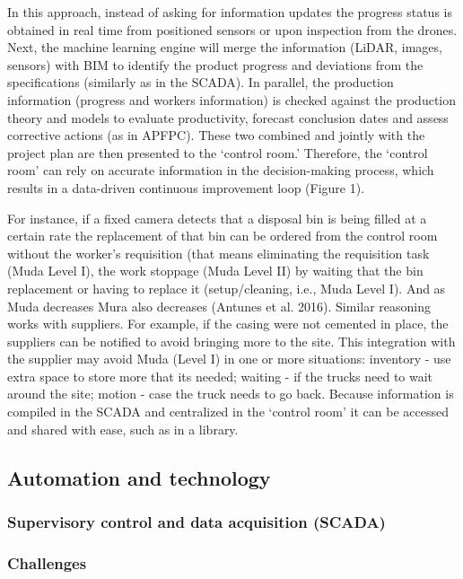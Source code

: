 \documentclass{article}
\begin{document}
In this approach, instead of asking for information updates the progress status is obtained in real time from positioned sensors or upon inspection from the drones.
Next, the machine learning engine will merge the information (LiDAR, images, sensors) with BIM to identify the product progress and deviations from the specifications (similarly as in the SCADA).
In parallel, the production information (progress and workers information) is checked against the production theory and models to evaluate productivity, forecast conclusion dates and assess corrective actions (as in APFPC).
These two combined and jointly with the project plan are then presented to the ‘control room.’
Therefore, the ‘control room’ can rely on accurate information in the decision-making process, which results in a data-driven continuous improvement loop (Figure 1).

For instance, if a fixed camera detects that a disposal bin is being filled at a certain rate the replacement of that bin can be ordered from the control room without the worker’s requisition (that means eliminating the requisition task (Muda Level I), the work stoppage (Muda Level II) by waiting that the bin replacement or having to replace it (setup/cleaning, i.e., Muda Level I).
And as Muda decreases Mura also decreases (Antunes et al. 2016).
Similar reasoning works with suppliers.
For example, if the casing were not cemented in place, the suppliers can be notified to avoid bringing more to the site.
This integration with the supplier may avoid Muda (Level I) in one or more situations: inventory - use extra space to store more that its needed; waiting - if the trucks need to wait around the site; motion - case the truck needs to go back.
Because information is compiled in the SCADA and centralized in the ‘control room’ it can be accessed and shared with ease, such as in a library.

\subsection{Automation and technology}
\label{sec:org5dee6fd}
\subsubsection{Supervisory control and data acquisition (SCADA)}
\label{sec:orgefd422f}
\subsubsection{Challenges}
\label{sec:orgaf4367a}
\end{document}
